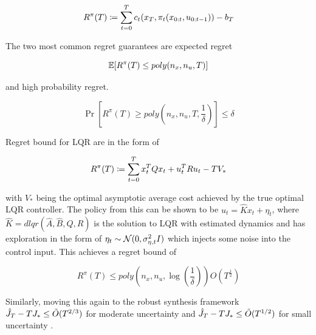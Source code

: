 \documentclass{article}[12pt]
\begin{document}
\begin{equation}
    R^{\pi}(T) \coloneqq \sum_{t=0}^{T} c_t(x_T,\pi_t(x_{0:t},u_{0:t-1})) -b_T\\
\end{equation}

The two most common regret guarantees are expected regret 

\begin{equation}
    \mathbb{E}[R^{\pi}(T) \leq poly(n_x,n_u,T)]
\end{equation}

and high probability regret.

\begin{equation}
    \Pr[R^{\pi}(T) \geq poly(n_x,n_u,T,\frac{1}{\delta})] \leq \delta
\end{equation}

Regret bound for LQR are in the form of 

\begin{equation}
    R^{\pi}(T) \coloneqq \sum_{t=0}^{T} x_t^TQx_t + u_t^TRu_t - TV_*\\
\end{equation}

with  $V_*$ being the optimal asymptotic average cost achieved by the true optimal LQR controller. The policy from this can be shown to be $u_t = \hat{K}x_t + \eta_t$, where $\hat{K} = dlqr(\hat{A},\hat{B},Q,R)$ is the solution to LQR with estimated dynamics and has exploration in the form of $\eta_t \sim \mathcal{N}(0,\sigma_{\eta,t}^2 I)$ which injects some noise into the control input. This achieves a regret bound of 

\begin{equation}
    R^{\pi}(T) \leq poly(n_x,n_u,\log(\frac{1}{\delta}))O(T^{\frac{1}{2}})
\end{equation}

Similarly, moving this again to the robust synthesis framework $\hat{J}_T - TJ_* \leq \Tilde{O}(T^{2/3})$ for moderate uncertainty \cite{DeanEtAl18} and $\hat{J}_T - TJ_* \leq \Tilde{O}(T^{1/2})$ for small uncertainty \cite{ManiaEtAl19}.




\end{document}

